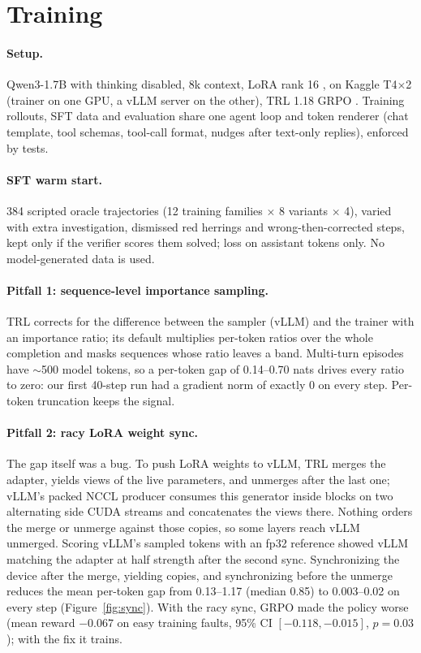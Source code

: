 \documentclass[11pt]{article}
\begin{document}
\section{Training}
\paragraph{Setup.} Qwen3-1.7B \citep{qwen3} with thinking disabled, 8k context, LoRA rank 16 \citep{hu2022lora}, on Kaggle T4$\times$2 (trainer on one GPU, a vLLM server \citep{kwon2023vllm} on the other), TRL 1.18 GRPO \citep{vonwerra2020trl,shao2024deepseekmath}. Training rollouts, SFT data and evaluation share one agent loop and token renderer (chat template, tool schemas, tool-call format, nudges after text-only replies), enforced by tests.

\paragraph{SFT warm start.} 384 scripted oracle trajectories (12 training families $\times$ 8 variants $\times$ 4), varied with extra investigation, dismissed red herrings and wrong-then-corrected steps, kept only if the verifier scores them solved; loss on assistant tokens only. No model-generated data is used.

\paragraph{Pitfall 1: sequence-level importance sampling.} TRL corrects for the difference between the sampler (vLLM) and the trainer with an importance ratio; its default multiplies per-token ratios over the whole completion and masks sequences whose ratio leaves a band. Multi-turn episodes have $\sim$500 model tokens, so a per-token gap of 0.14--0.70 nats drives every ratio to zero: our first 40-step run had a gradient norm of exactly 0 on every step. Per-token truncation keeps the signal.

\paragraph{Pitfall 2: racy LoRA weight sync.} The gap itself was a bug. To push LoRA weights to vLLM, TRL merges the adapter, yields views of the live parameters, and unmerges after the last one; vLLM's packed NCCL producer consumes this generator inside blocks on two alternating side CUDA streams and concatenates the views there. Nothing orders the merge or unmerge against those copies, so some layers reach vLLM unmerged. Scoring vLLM's sampled tokens with an fp32 reference showed vLLM matching the adapter at half strength after the second sync. Synchronizing the device after the merge, yielding copies, and synchronizing before the unmerge reduces the mean per-token gap from 0.13--1.17 (median 0.85) to 0.003--0.02 on every step (Figure~\ref{fig:sync}). With the racy sync, GRPO made the policy worse (mean reward $-0.067$ on easy training faults, 95\% CI $[-0.118, -0.015]$, $p=0.03$); with the fix it trains.
\end{document}
